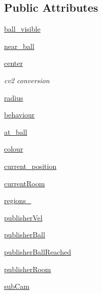 \subsection*{Public Attributes}
\begin{DoxyCompactItemize}
\item 
\hyperlink{classopencv__tracking_1_1track__ball_a2fd263ce72f097474d63022a51a1aff9}{ball\+\_\+visible}
\item 
\hyperlink{classopencv__tracking_1_1track__ball_a38f20351ab0571002f7552aed7bb6979}{near\+\_\+ball}
\item 
\hyperlink{classopencv__tracking_1_1track__ball_a92050fb578b1e2e7bea37b0abdbf26aa}{center}
\begin{DoxyCompactList}\small\item\em cv2 conversion \end{DoxyCompactList}\item 
\hyperlink{classopencv__tracking_1_1track__ball_ae497b649948b1e33fb3cc71b01646da3}{radius}
\item 
\hyperlink{classopencv__tracking_1_1track__ball_ace82efcb5e44b826ac65d61642b447a8}{behaviour}
\item 
\hyperlink{classopencv__tracking_1_1track__ball_aa6598d127ab29a020efbfa871ca23b05}{at\+\_\+ball}
\item 
\hyperlink{classopencv__tracking_1_1track__ball_ad8c66a1a437111152cf8f5797254c0d1}{colour}
\item 
\hyperlink{classopencv__tracking_1_1track__ball_a75f1f4ff39bc26ce8c491ce414f33148}{current\+\_\+position}
\item 
\hyperlink{classopencv__tracking_1_1track__ball_a6da54ed7cc2308ea868656753da993ed}{current\+Room}
\item 
\hyperlink{classopencv__tracking_1_1track__ball_ad2db5078420ea3bf434f25b5dbb961d2}{regions\+\_\+}
\item 
\hyperlink{classopencv__tracking_1_1track__ball_af438ed0f8535d82d07c18b657e19678d}{publisher\+Vel}
\item 
\hyperlink{classopencv__tracking_1_1track__ball_ad351c91525368a89ff0a7bb1d257b3d1}{publisher\+Ball}
\item 
\hyperlink{classopencv__tracking_1_1track__ball_ac5b8f531d5d47698064aafcb9b0a2892}{publisher\+Ball\+Reached}
\item 
\hyperlink{classopencv__tracking_1_1track__ball_a6be8c256872f52e19a7fb0ca60dc61a9}{publisher\+Room}
\item 
\hyperlink{classopencv__tracking_1_1track__ball_a6a59156565d2de7078b22a42f78bea15}{sub\+Cam}

\end{DoxyCompactItemize}
